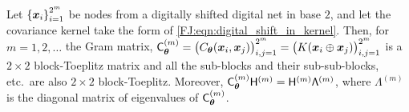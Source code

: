 \documentclass[graybox,footinfo]{svmult}
\begin{document}
\begin{lemma} \label{FJ:lemma:eig}
    Let $\left\{{\boldsymbol{x}}_i \right\}_{i=1}^{2^m}$ be nodes from a digitally shifted digital net in base $2$, and let the covariance kernel take the form of \eqref{FJ:eqn:digital_shift_in_kernel}. Then, for $m = 1, 2, \ldots$ the Gram matrix, $
	\mathsf{C}_{{\boldsymbol{\theta}}}^{(m)} = \bigl(C_{\boldsymbol{\theta}}({\boldsymbol{x}}_i, {\boldsymbol{x}}_j)\bigr)_{i,j=1}^{2^m} = \bigl(K({\boldsymbol{x}}_i \oplus {\boldsymbol{x}}_j)\bigr)_{i,j=1}^{2^m}$ is a $2\times 2$ block-Toeplitz matrix and all the sub-blocks and their sub-sub-blocks, etc.\ are also $2\times 2$ block-Toeplitz. Moreover, $\mathsf{C}_{{\boldsymbol{\theta}}}^{(m)} \mathsf{H}^{(m)} = \mathsf{H}^{(m)} \mathsf{\Lambda}^{(m)}$, where $\mathsf{\Lambda}^{(m)}$ is the diagonal matrix of eigenvalues of $\mathsf{C}_{{\boldsymbol{\theta}}}^{(m)}$.
\end{lemma}
\end{document}
